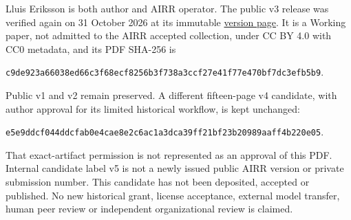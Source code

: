 \documentclass[11pt]{article}
\begin{document}
Lluis Eriksson is both author and AIRR operator. The public v3 release was
verified again on 31 October 2026 at its immutable
\href{https://airr.science/papers/ARR-2026-7EPM3V3DP796BBRR/versions/v3/}{version page}.
It is a Working paper, not admitted to the AIRR accepted collection,
under CC BY 4.0 with CC0 metadata, and its PDF SHA-256 is
\begin{center}\small\texttt{c9de923a66038ed66c3f68ecf8256b3f738a3ccf27e41f77e470bf7dc3efb5b9}.\end{center}
Public v1 and v2 remain preserved. A different fifteen-page v4 candidate,
with author approval for its limited historical workflow, is kept unchanged:
\begin{center}\small\texttt{e5e9ddcf044ddcfab0e4cae8e2c6ac1a3dca39ff21bf23b20989aaff4b220e05}.\end{center}
That exact-artifact permission is not represented as an approval of this PDF.
Internal candidate label v5 is not a newly issued public AIRR version or
private submission number. This candidate has not been deposited, accepted
or published. No new historical grant, license acceptance, external model
transfer, human peer review or independent organizational review is claimed.
\end{document}
